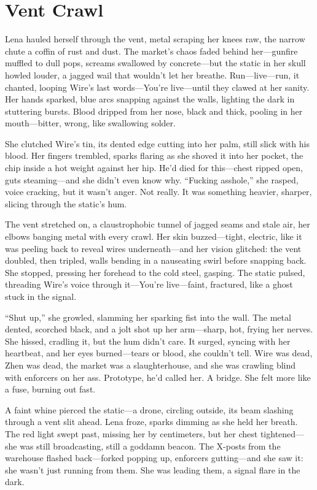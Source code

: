 \documentclass[12pt]{book}
\begin{document}
\section{Vent Crawl}

Lena hauled herself through the vent, metal scraping her knees raw, the narrow chute a coffin of rust and dust. The market’s chaos faded behind her—gunfire muffled to dull pops, screams swallowed by concrete—but the static in her skull howled louder, a jagged wail that wouldn’t let her breathe. Run—live—run, it chanted, looping Wire’s last words—You’re live—until they clawed at her sanity. Her hands sparked, blue arcs snapping against the walls, lighting the dark in stuttering bursts. Blood dripped from her nose, black and thick, pooling in her mouth—bitter, wrong, like swallowing solder.

She clutched Wire’s tin, its dented edge cutting into her palm, still slick with his blood. Her fingers trembled, sparks flaring as she shoved it into her pocket, the chip inside a hot weight against her hip. He’d died for this—chest ripped open, guts steaming—and she didn’t even know why. “Fucking asshole,” she rasped, voice cracking, but it wasn’t anger. Not really. It was something heavier, sharper, slicing through the static’s hum.

The vent stretched on, a claustrophobic tunnel of jagged seams and stale air, her elbows banging metal with every crawl. Her skin buzzed—tight, electric, like it was peeling back to reveal wires underneath—and her vision glitched: the vent doubled, then tripled, walls bending in a nauseating swirl before snapping back. She stopped, pressing her forehead to the cold steel, gasping. The static pulsed, threading Wire’s voice through it—You’re live—faint, fractured, like a ghost stuck in the signal.

“Shut up,” she growled, slamming her sparking fist into the wall. The metal dented, scorched black, and a jolt shot up her arm—sharp, hot, frying her nerves. She hissed, cradling it, but the hum didn’t care. It surged, syncing with her heartbeat, and her eyes burned—tears or blood, she couldn’t tell. Wire was dead, Zhen was dead, the market was a slaughterhouse, and she was crawling blind with enforcers on her ass. Prototype, he’d called her. A bridge. She felt more like a fuse, burning out fast.

A faint whine pierced the static—a drone, circling outside, its beam slashing through a vent slit ahead. Lena froze, sparks dimming as she held her breath. The red light swept past, missing her by centimeters, but her chest tightened—she was still broadcasting, still a goddamn beacon. The X-posts from the warehouse flashed back—forked popping up, enforcers gutting—and she saw it: she wasn’t just running from them. She was leading them, a signal flare in the dark.
\end{document}
